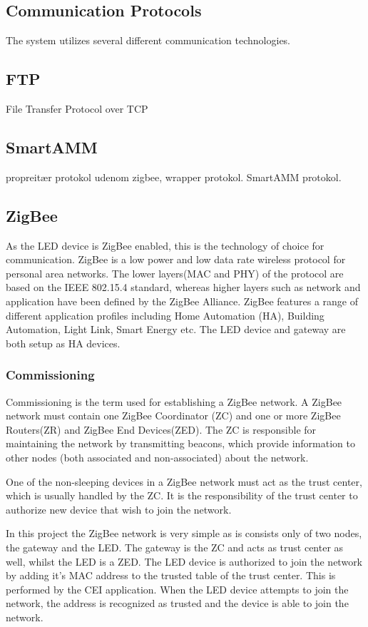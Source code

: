 \documentclass[Main]{subfiles}
\begin{document}
	\subsection{Communication Protocols}
		The system utilizes several different communication technologies.

		\subsection{FTP}
			File Transfer Protocol over TCP


		\subsection{SmartAMM}
			propreitær protokol udenom zigbee, wrapper protokol. SmartAMM protokol. 

		\subsection{ZigBee}
			As the LED device is ZigBee enabled, this is the technology of choice for communication. 
			ZigBee is a low power and low data rate wireless protocol for personal area networks. 
			The lower layers(MAC and PHY) of the protocol are based on the IEEE 802.15.4 standard\cite{ZigBeeSpec}, whereas higher layers such as network and application have been defined by the ZigBee Alliance.
			ZigBee features a range of different application profiles including Home Automation (HA), Building Automation, Light Link, Smart Energy etc\cite{ZigBeeApplicationProfiles:Online}.
			The LED device and gateway are both setup as HA devices. 

			\subsubsection{Commissioning}
				Commissioning is the term used for establishing a ZigBee network.
				A ZigBee network must contain one ZigBee Coordinator (ZC) and one or more ZigBee Routers(ZR) and ZigBee End Devices(ZED). 
				The ZC is responsible for maintaining the network by transmitting beacons, which provide information to other nodes (both associated and non-associated) about the network.

				One of the non-sleeping devices in a ZigBee network must act as the trust center, which is usually handled by the ZC. 
				It is the responsibility of the trust center to authorize new device that wish to join the network.

				In this project the ZigBee network is very simple as is consists only of two nodes, the gateway and the LED. 
				The gateway is the ZC and acts as trust center as well, whilst the LED is a ZED.
				The LED device is authorized to join the network by adding it's MAC address to the trusted table of the trust center. 
				This is performed by the CEI application.
				When the LED device attempts to join the network, the address is recognized as trusted and the device is able to join the network. 
\end{document}
